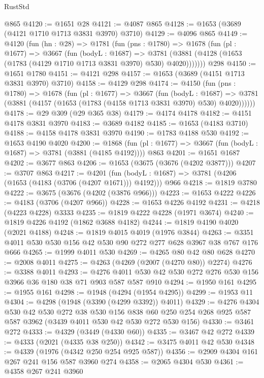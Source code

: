 \begin{lexlean}{RustStd}
\begin{coremodule}
{\begin{coremodule}
{{{{{{{{{{{{{{{{    @865
@4120 := @1651 @28
@4121 := @4087 @865
@4128 := @1653 (@3689 (@4121 @1710 @1713 @3831 @3970) @3710)
@4129 := @4096 @865
@4149 := @4120
    (fun (hn : @28) =>
    @1781
      (fun (pns : @1780) =>
      @1678
        (fun (pl : @1677) =>
        @3667
          (fun (bodyL : @1687) =>
          @3781 (@3881 (@4128 (@1653 (@1783 (@4129 @1710 @1713 @3831 @3970) @530) @4020)))))))
    @298
@4150 := @1651 @1780
@4151 := @4121 @298
@4157 := @1653 (@3689 (@4151 @1713 @3831 @3970) @3710)
@4158 := @4129 @298
@4174 := @4150
    (fun (pns : @1780) =>
    @1678
      (fun (pl : @1677) =>
      @3667
        (fun (bodyL : @1687) =>
        @3781 (@3881 (@4157 (@1653 (@1783 (@4158 @1713 @3831 @3970) @530) @4020))))))
@4178 := @29 @309 (@29 @365 @38)
@4179 := @4174 @4178
@4182 := @4151 @4178 @3831 @3970
@4183 := @3689 @4182
@4185 := @1653 (@4183 @3710)
@4188 := @4158 @4178 @3831 @3970
@4190 := @1783 @4188 @530
@4192 := @1653 @4190 @4020
@4200 := @1868 (fun (pl : @1677) => @3667 (fun (bodyL : @1687) => @3781 (@3881 (@4185 @4192)))) @863
@4201 := @1651 @1687
@4202 := @3677 @863
@4206 := @1653 (@3675 (@3676 (@4202 @3877)))
@4207 := @3707 @863
@4217 := @4201
    (fun (bodyL : @1687) => @3781 (@4206 (@1653 (@4183 (@3706 (@4207 @1671))) @4192)))
    @966
@4218 := @1819 @3780
@4222 := @3675 (@3676 (@4202 (@3876 @966)))
@4223 := @1653 @4222
@4226 := @4183 (@3706 (@4207 @966))
@4228 := @1653 @4226 @4192
@4231 := @4218 (@4223 @4228) @3333
@4235 := @1819 @4222 @4228 (@1971 @3674)
@4240 := @1819 @4226 @4192 (@1862 @3688 @4182)
@4244 := @1819 @4190 @4020 (@2021 @4188)
@4248 := @1819 @4015 @4019 (@1976 @3844)
@4263 := @3351 @4011 @530 @530 @156 @42 @530 @90 @272 @277 @628 @3967 @38 @767 @176 @666
@4265 := @1999 @4011 @530
@4269 := @4265 @80 @42 @80 @628
@4270 := @2008 @4011
@4275 := @4263 (@4269 (@2007 (@4270 @80)) @2274)
@4276 := @3388 @4011
@4293 := @4276 @4011 @530 @42 @530 @272 @276 @530 @156 @3966 @36 @180 @38 @71 @903 @587 @587 @910
@4294 := @1950 @161
@4295 := @1955 @161
@4298 := @1948 (@4294 (@1954 @4295))
@4299 := @1953 @11
@4304 := @4298 (@1948 (@3390 (@4299 @3392)) @4011)
@4329 := @4276
    @4304
    @530
    @42
    @530
    @272
    @38
    @530
    @156
    @838
    @60
    @250
    @254
    @268
    @925
    @587
    @587
    @3962
    (@3439 @4011 @530 @42 @530 @272 @530 @156)
@4330 := @3461 @272
@4333 := @4329 (@3449 (@4330 @60))
@4335 := @3467 @42 @272
@4339 := @4333 (@2021 (@4335 @38 @250))
@4342 := @3475 @4011 @42 @530
@4348 := @4339 (@1976 (@4342 @250 @254 @925 @587))
@4356 := @2909 @4304 @161 @267 @241 @156 @587 @3960 @274
@4358 := @2065 @4304 @530
@4361 := @4358 @267 @241 @3960
}}}}}}}}}}}}}}}}
\end{coremodule}}
\end{coremodule}
\end{lexlean}
